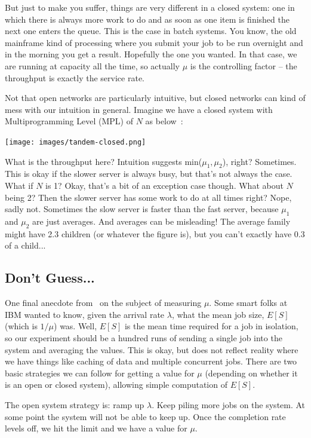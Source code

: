 \documentclass[a4paper]{report}
\begin{document}
But just to make you suffer, things are very different in a closed system: one in which there is always more work to do and as soon as one item is finished the next one enters the queue. This is the case in batch systems. You know, the old mainframe kind of processing where you submit your job to be run overnight and in the morning you get a result. Hopefully the one you wanted. In that case, we are running at capacity all the time, so actually $\mu$ is the controlling factor -- the throughput is exactly the service rate. 

Not that open networks are particularly intuitive, but closed networks can kind of mess with our intuition in general. Imagine we have a closed system with Multiprogramming Level (MPL) of $N$ as below~\cite{pmd}:

\begin{center}
	\texttt{[image: images/tandem-closed.png]}
\end{center}

What is the throughput here? Intuition suggests min($\mu_{1}, \mu_{2}$), right? Sometimes. This is okay if the slower server is always busy, but that's not always the case. What if $N$ is 1? Okay, that's a bit of an exception case though. What about $N$ being 2? Then the slower server has some work to do at all times right? Nope, sadly not. Sometimes the slow server is faster than the fast server, because $\mu_{1}$ and $\mu_{2}$ are just averages. And averages can be misleading! The average family might have 2.3 children (or whatever the figure is), but you can't exactly have 0.3 of a child...

\subsection*{Don't Guess...}
One final anecdote from~\cite{pmd} on the subject of measuring $\mu$. Some smart folks at IBM wanted to know, given the arrival rate $\lambda$, what the mean job size, $E[S]$ (which is $1/\mu$) was. Well, $E[S]$ is the mean time required for a job in isolation, so our experiment should be a hundred runs of sending a single job into the system and averaging the values. This is okay, but does not reflect reality where we have things like caching of data and multiple concurrent jobs. There are two basic strategies we can follow for getting a value for $\mu$ (depending on whether it is an open or closed system), allowing simple computation of $E[S]$.

The open system strategy is: ramp up $\lambda$. Keep piling more jobs on the system. At some point the system will not be able to keep up. Once the completion rate levels off, we hit the limit and we have a value for $\mu$.
\end{document}
